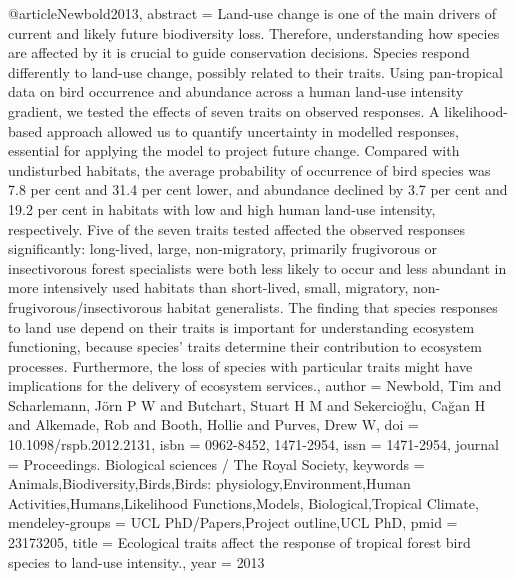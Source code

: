 {{@article{Newbold2013,
abstract = {Land-use change is one of the main drivers of current and likely future biodiversity loss. Therefore, understanding how species are affected by it is crucial to guide conservation decisions. Species respond differently to land-use change, possibly related to their traits. Using pan-tropical data on bird occurrence and abundance across a human land-use intensity gradient, we tested the effects of seven traits on observed responses. A likelihood-based approach allowed us to quantify uncertainty in modelled responses, essential for applying the model to project future change. Compared with undisturbed habitats, the average probability of occurrence of bird species was 7.8 per cent and 31.4 per cent lower, and abundance declined by 3.7 per cent and 19.2 per cent in habitats with low and high human land-use intensity, respectively. Five of the seven traits tested affected the observed responses significantly: long-lived, large, non-migratory, primarily frugivorous or insectivorous forest specialists were both less likely to occur and less abundant in more intensively used habitats than short-lived, small, migratory, non-frugivorous/insectivorous habitat generalists. The finding that species responses to land use depend on their traits is important for understanding ecosystem functioning, because species' traits determine their contribution to ecosystem processes. Furthermore, the loss of species with particular traits might have implications for the delivery of ecosystem services.},
author = {Newbold, Tim and Scharlemann, J{\"{o}}rn P W and Butchart, Stuart H M and Sekercioğlu, Cağan H and Alkemade, Rob and Booth, Hollie and Purves, Drew W},
doi = {10.1098/rspb.2012.2131},
isbn = {0962-8452, 1471-2954},
issn = {1471-2954},
journal = {Proceedings. Biological sciences / The Royal Society},
keywords = {Animals,Biodiversity,Birds,Birds: physiology,Environment,Human Activities,Humans,Likelihood Functions,Models, Biological,Tropical Climate},
mendeley-groups = {UCL PhD/Papers,Project outline,UCL PhD},
pmid = {23173205},
title = {{Ecological traits affect the response of tropical forest bird species to land-use intensity.}},
year = {2013}
}

}}
